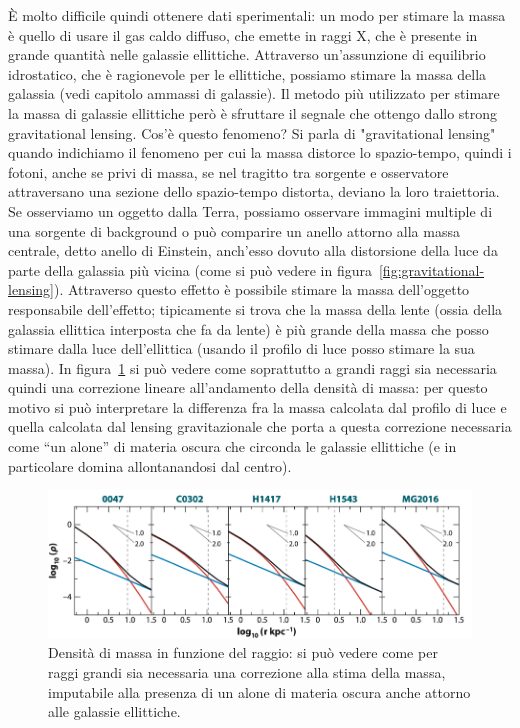 È molto difficile quindi ottenere dati sperimentali: un modo per stimare la massa è quello di usare il gas caldo diffuso, che emette in raggi X, che è presente in grande quantità nelle galassie ellittiche. Attraverso un’assunzione di equilibrio idrostatico, che è ragionevole per le ellittiche, possiamo stimare la massa della galassia (vedi capitolo ammassi di galassie).
Il metodo più utilizzato per stimare la massa di galassie ellittiche però è sfruttare il segnale che ottengo dallo strong gravitational lensing. Cos'è questo fenomeno? Si parla di "gravitational lensing" quando indichiamo il fenomeno per cui la massa distorce lo spazio-tempo, quindi i fotoni, anche se privi di massa, se nel tragitto tra sorgente e osservatore attraversano una sezione dello spazio-tempo distorta, deviano la loro traiettoria. Se osserviamo un oggetto dalla Terra, possiamo osservare immagini multiple di una sorgente di background o può comparire un anello attorno alla massa centrale, detto anello di Einstein, anch'esso dovuto alla distorsione della luce da parte della galassia più vicina (come si può vedere in figura~\ref{fig:gravitational-lensing}). Attraverso questo effetto è possibile stimare la massa dell’oggetto responsabile dell’effetto; tipicamente si trova che la massa della lente (ossia della galassia ellittica interposta che fa da lente) è più grande della massa che posso stimare dalla luce dell’ellittica (usando il profilo di luce posso stimare la sua massa). In figura~\ref{fig:materia-oscura-ellittiche} si può vedere come soprattutto a grandi raggi sia necessaria quindi una correzione lineare all'andamento della densità di massa: per questo motivo si può interpretare la differenza fra la massa calcolata dal profilo di luce e quella calcolata dal lensing gravitazionale che porta a questa correzione necessaria come “un alone” di materia oscura che circonda le galassie ellittiche (e in particolare domina allontanandosi dal centro).

\begin{figure}
    \centering
    \includegraphics[width = 0.8 \textwidth]{immagini/materia-oscura-ellittiche.png}
    \caption{Densità di massa in funzione del raggio: si può vedere come per raggi grandi sia necessaria una correzione alla stima della massa, imputabile alla presenza di un alone di materia oscura anche attorno alle galassie ellittiche.}
    \label{fig:materia-oscura-ellittiche}
\end{figure}